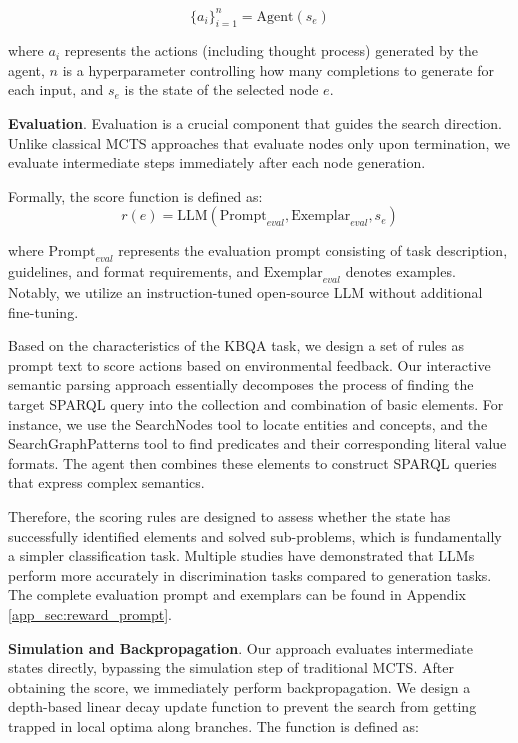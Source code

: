 \begin{equation}
    \{a_i\}_{i=1}^n = \text{Agent}(s_e)
\end{equation}

where $a_i$ represents the actions (including thought process) generated by the agent, $n$ is a hyperparameter controlling how many completions to generate for each input, and $s_e$ is the state of the selected node $e$.


\textbf{Evaluation}.
Evaluation is a crucial component that guides the search direction.
Unlike classical MCTS approaches that evaluate nodes only upon termination, we evaluate intermediate steps immediately after each node generation.

Formally, the score function is defined as:
\begin{equation}
    r(e) = \text{LLM}(\text{Prompt}_{eval}, \text{Exemplar}_{eval}, s_e)
\end{equation}

where $\text{Prompt}_{eval}$ represents the evaluation prompt consisting of task description, guidelines, and format requirements, and $\text{Exemplar}_{eval}$ denotes examples. Notably, we utilize an instruction-tuned open-source LLM without additional fine-tuning.

Based on the characteristics of the KBQA task, we design a set of rules as prompt text to score actions based on environmental feedback.
Our interactive semantic parsing approach essentially decomposes the process of finding the target SPARQL query into the collection and combination of basic elements.
For instance, we use the SearchNodes tool to locate entities and concepts, and the SearchGraphPatterns tool to find predicates and their corresponding literal value formats. The agent then combines these elements to construct SPARQL queries that express complex semantics.

Therefore, the scoring rules are designed to assess whether the state has successfully identified elements and solved sub-problems, which is fundamentally a simpler classification task.
Multiple studies \citep{Gu-Yu-ACL-2023-Pangu,Chen-Ziru-ACL-2024-Why-Tree-Search} have demonstrated that LLMs perform more accurately in discrimination tasks compared to generation tasks. 
The complete evaluation prompt and exemplars can be found in Appendix \ref{app_sec:reward_prompt}.

\textbf{Simulation and Backpropagation}.
Our approach evaluates intermediate states directly, bypassing the simulation step of traditional MCTS.
After obtaining the score, we immediately perform backpropagation.
We design a depth-based linear decay update function to prevent the search from getting trapped in local optima along branches. The function is defined as:

